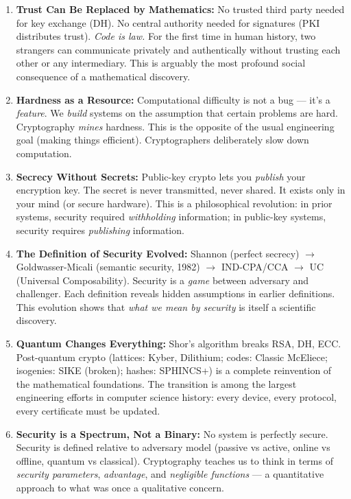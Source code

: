 \begin{enumerate}
\item \textbf{Trust Can Be Replaced by Mathematics:} No trusted third party needed for key exchange (DH). No central authority needed for signatures (PKI distributes trust). \emph{Code is law.} For the first time in human history, two strangers can communicate privately and authentically without trusting each other or any intermediary. This is arguably the most profound social consequence of a mathematical discovery.

\item \textbf{Hardness as a Resource:} Computational difficulty is not a bug — it's a \emph{feature}. We \emph{build} systems on the assumption that certain problems are hard. Cryptography \emph{mines} hardness. This is the opposite of the usual engineering goal (making things efficient). Cryptographers deliberately slow down computation.

\item \textbf{Secrecy Without Secrets:} Public-key crypto lets you \emph{publish} your encryption key. The secret is never transmitted, never shared. It exists only in your mind (or secure hardware). This is a philosophical revolution: in prior systems, security required \emph{withholding} information; in public-key systems, security requires \emph{publishing} information.

\item \textbf{The Definition of Security Evolved:} Shannon (perfect secrecy) $\to$ Goldwasser-Micali (semantic security, 1982) $\to$ IND-CPA/CCA $\to$ UC (Universal Composability). Security is a \emph{game} between adversary and challenger. Each definition reveals hidden assumptions in earlier definitions. This evolution shows that \emph{what we mean by security} is itself a scientific discovery.

\item \textbf{Quantum Changes Everything:} Shor's algorithm breaks RSA, DH, ECC. Post-quantum crypto (lattices: Kyber, Dilithium; codes: Classic McEliece; isogenies: SIKE (broken); hashes: SPHINCS+) is a complete reinvention of the mathematical foundations. The transition is among the largest engineering efforts in computer science history: every device, every protocol, every certificate must be updated.

\item \textbf{Security is a Spectrum, Not a Binary:} No system is perfectly secure. Security is defined relative to adversary model (passive vs active, online vs offline, quantum vs classical). Cryptography teaches us to think in terms of \emph{security parameters}, \emph{advantage}, and \emph{negligible functions} — a quantitative approach to what was once a qualitative concern.


\end{enumerate}
